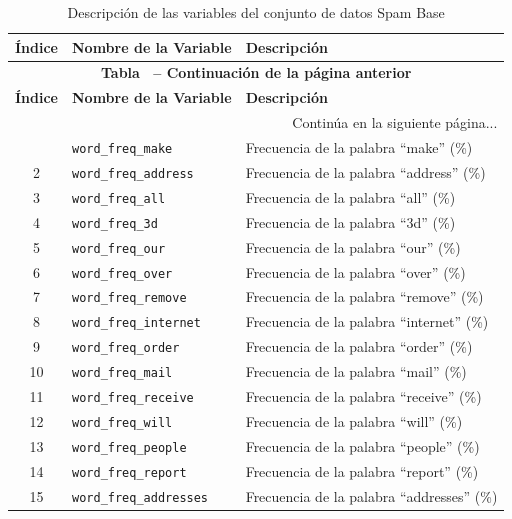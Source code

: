\documentclass[a4paper,11pt]{book}
\renewcommand{\tablename}{Tabla}
\begin{document}
\begin{longtable}{|c|l|l|}
\caption{Descripción de las variables del conjunto de datos Spam Base} \label{tab:variables_spambase} \\
\hline
\rowcolor[HTML]{D9EAD3} 
\textbf{Índice} & \textbf{Nombre de la Variable} & \textbf{Descripción} \\ \hline
\endfirsthead
\multicolumn{3}{c}{{\bfseries \tablename\ \thetable{} -- Continuación de la página anterior}} \\
\hline
\rowcolor[HTML]{D9EAD3} 
\textbf{Índice} & \textbf{Nombre de la Variable} & \textbf{Descripción} \\ \hline
\endhead
\hline \multicolumn{3}{|r|}{{Continúa en la siguiente página...}} \\ \hline
\endfoot
\hline \hline
\endlastfoot
1 & \texttt{word\_freq\_make} & Frecuencia de la palabra ``make'' (\%) \\ \hline
2 & \texttt{word\_freq\_address} & Frecuencia de la palabra ``address'' (\%) \\ \hline
3 & \texttt{word\_freq\_all} & Frecuencia de la palabra ``all'' (\%) \\ \hline
4 & \texttt{word\_freq\_3d} & Frecuencia de la palabra ``3d'' (\%) \\ \hline
5 & \texttt{word\_freq\_our} & Frecuencia de la palabra ``our'' (\%) \\ \hline
6 & \texttt{word\_freq\_over} & Frecuencia de la palabra ``over'' (\%) \\ \hline
7 & \texttt{word\_freq\_remove} & Frecuencia de la palabra ``remove'' (\%) \\ \hline
8 & \texttt{word\_freq\_internet} & Frecuencia de la palabra ``internet'' (\%) \\ \hline
9 & \texttt{word\_freq\_order} & Frecuencia de la palabra ``order'' (\%) \\ \hline
10 & \texttt{word\_freq\_mail} & Frecuencia de la palabra ``mail'' (\%) \\ \hline
11 & \texttt{word\_freq\_receive} & Frecuencia de la palabra ``receive'' (\%) \\ \hline
12 & \texttt{word\_freq\_will} & Frecuencia de la palabra ``will'' (\%) \\ \hline
13 & \texttt{word\_freq\_people} & Frecuencia de la palabra ``people'' (\%) \\ \hline
14 & \texttt{word\_freq\_report} & Frecuencia de la palabra ``report'' (\%) \\ \hline
15 & \texttt{word\_freq\_addresses} & Frecuencia de la palabra ``addresses'' (\%) \\ \hline

\end{longtable}
\end{document}
